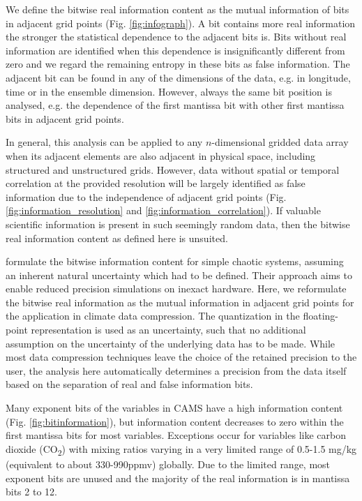 We define the bitwise real information content as the mutual information
\citep{Shannon1948,MacKay2003a,Schreiber2000,Kraskov2004,Pothapakula2019,DelSole2004} of bits in
adjacent grid points (Fig. \ref{fig:infograph}). A bit contains more real information the stronger the statistical
dependence to the adjacent bits is. Bits without real information are identified when this dependence is
insignificantly different from zero and we regard the remaining entropy in these bits as false information.
The adjacent bit can be found in any of the dimensions of the data, e.g. in longitude, time or in the ensemble
dimension. However, always the same bit position is analysed, e.g. the dependence of the first mantissa bit
with other first mantissa bits in adjacent grid points. 

In general, this analysis can be applied to any $n$-dimensional gridded data array when its adjacent elements
are also adjacent in physical space, including structured and unstructured grids. However, data without spatial
or temporal correlation at the provided resolution will be largely identified as false information due to the
independence of adjacent grid points (Fig. \ref{fig:information_resolution} and \ref{fig:information_correlation}).
If valuable scientific information is present in such seemingly random data, then the bitwise real information
content as defined here is unsuited. 

\cite{Jeffress2017} formulate the bitwise information content for simple chaotic systems, assuming an
inherent natural uncertainty which had to be defined. Their approach aims to enable reduced precision
simulations on inexact hardware. Here, we reformulate the bitwise real information as the mutual information
in adjacent grid points for the application in climate data compression. The quantization in the floating-point
representation is used as an uncertainty, such that no additional assumption on the uncertainty of the underlying
data has to be made. While most data compression techniques leave the choice of the retained precision to the user,
the analysis here automatically determines a precision from the data itself based on the separation of real and
false information bits.     

Many exponent bits of the variables in CAMS have a high information content (Fig. \ref{fig:bitinformation}),
but information content decreases to zero within the first mantissa bits for most variables.
Exceptions occur for variables like carbon dioxide (CO\textsubscript{2}) with mixing ratios varying in a very
limited range of 0.5-1.5 mg/kg (equivalent to about 330-990ppmv) globally. Due to the limited range,
most exponent bits are unused and the majority of the real information is in mantissa bits 2 to 12.

